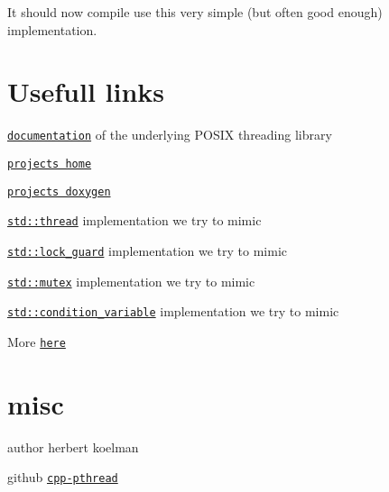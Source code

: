 It should now compile use this very simple (but often good enough) implementation.

\section*{Usefull links}


\begin{DoxyItemize}
\item \href{http://pubs.opengroup.org/onlinepubs/007908799/xsh/threads.html}{\tt documentation} of the underlying P\+O\+S\+IX threading library
\item \href{https://github.com/HerbertKoelman/cpp-pthread}{\tt project\textquotesingle{}s home}
\item \href{http://herbertkoelman.github.io/cpp-pthread/doc/html/}{\tt project\textquotesingle{}s doxygen}
\item \href{http://en.cppreference.com/w/cpp/thread/thread}{\tt std\+::thread} implementation we try to mimic
\item \href{http://en.cppreference.com/w/cpp/thread/lock_guard/lock_guard}{\tt std\+::lock\+\_\+guard} implementation we try to mimic
\item \href{http://en.cppreference.com/w/cpp/thread/mutex}{\tt std\+::mutex} implementation we try to mimic
\item \href{http://en.cppreference.com/w/cpp/thread/condition_variable}{\tt std\+::condition\+\_\+variable} implementation we try to mimic
\end{DoxyItemize}

More \href{https://github.com/HerbertKoelman/cpp-pthread/wiki}{\tt here}

\section*{misc}


\begin{DoxyItemize}
\item author herbert koelman
\item github \href{https://github.com/HerbertKoelman/cpp-pthread}{\tt cpp-\/pthread} 
\end{DoxyItemize}